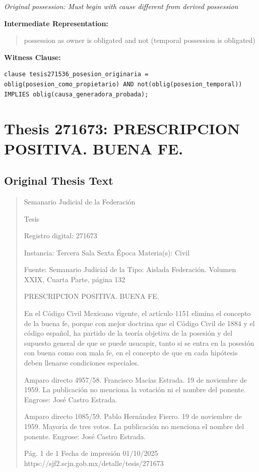 \documentclass[11pt,a4paper]{article}
\begin{document}
\textit{Original possession: Must begin with cause different from derived possession}

\textbf{Intermediate Representation:}

\begin{quote}
possession as owner is obligated and not (temporal possession is obligated)
\end{quote}

\textbf{Witness Clause:}

\begin{lstlisting}[style=witnessstyle, language=Witness]
clause tesis271536_posesion_originaria = oblig(posesion_como_propietario) AND not(oblig(posesion_temporal)) IMPLIES oblig(causa_generadora_probada);
\end{lstlisting}

\newpage

\section{Thesis 271673: PRESCRIPCION POSITIVA. BUENA FE.}
\label{thesis:271673}

\subsection{Original Thesis Text}

\begin{quote}
                                                   Semanario Judicial de la Federación

                                                  Tesis

 Registro digital: 271673

 Instancia: Tercera Sala          Sexta Época                           Materia(s): Civil

                                  Fuente: Semanario Judicial de la   Tipo: Aislada
                                  Federación.
                                  Volumen XXIX, Cuarta Parte, página
                                  132


PRESCRIPCION POSITIVA. BUENA FE.


En el Código Civil Mexicano vigente, el artículo 1151 elimina el concepto de la buena fe, porque con
mejor doctrina que el Código Civil de 1884 y el código español, ha partido de la teoría objetiva de la
posesión y del supuesto general de que se puede usucapir, tanto si se entra en la posesión con
buena como con mala fe, en el concepto de que en cada hipótesis deben llenarse condiciones
especiales.


Amparo directo 4957/58. Francisco Macías Estrada. 19 de noviembre de 1959. La publicación no
menciona la votación ni el nombre del ponente. Engrose: José Castro Estrada.

Amparo directo 1085/59. Pablo Hernández Fierro. 19 de noviembre de 1959. Mayoría de tres votos.
La publicación no menciona el nombre del ponente. Engrose: José Castro Estrada.




                                             Pág. 1 de 1             Fecha de impresión 01/10/2025
  https://sjf2.scjn.gob.mx/detalle/tesis/271673

\end{quote}
\end{document}

